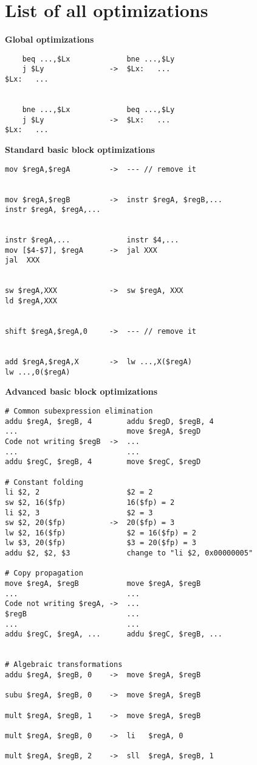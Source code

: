 \documentclass[10pt,a4paper]{article}
\begin{document}
\pagebreak
\appendix

\section{List of all optimizations}

\label{opt}

\textbf{Global optimizations}

\begin{verbatim}
    beq ...,$Lx             bne ...,$Ly
    j $Ly               ->  $Lx:   ...
$Lx:   ...


    bne ...,$Lx             beq ...,$Ly
    j $Ly               ->  $Lx:   ...
$Lx:   ...
\end{verbatim}
\textbf{Standard basic block optimizations}

\begin{verbatim}
mov $regA,$regA         ->  --- // remove it


mov $regA,$regB         ->  instr $regA, $regB,...
instr $regA, $regA,...


instr $regA,...             instr $4,...
mov [$4-$7], $regA      ->  jal XXX
jal  XXX


sw $regA,XXX            ->  sw $regA, XXX
ld $regA,XXX


shift $regA,$regA,0     ->  --- // remove it


add $regA,$regA,X       ->  lw ...,X($regA)
lw ...,0($regA)
\end{verbatim}
\textbf{Advanced basic block optimizations}

\begin{verbatim}
# Common subexpression elimination
addu $regA, $regB, 4        addu $regD, $regB, 4
...                         move $regA, $regD
Code not writing $regB  ->  ...
...                         ...
addu $regC, $regB, 4        move $regC, $regD

# Constant folding
li $2, 2                    $2 = 2
sw $2, 16($fp)              16($fp) = 2
li $2, 3                    $2 = 3
sw $2, 20($fp)          ->  20($fp) = 3
lw $2, 16($fp)              $2 = 16($fp) = 2
lw $3, 20($fp)              $3 = 20($fp) = 3
addu $2, $2, $3             change to "li $2, 0x00000005"

# Copy propagation
move $regA, $regB           move $regA, $regB
...                         ...
Code not writing $regA, ->  ...
$regB                       ...
...                         ...
addu $regC, $regA, ...      addu $regC, $regB, ...


# Algebraic transformations
addu $regA, $regB, 0    ->  move $regA, $regB

subu $regA, $regB, 0    ->  move $regA, $regB

mult $regA, $regB, 1    ->  move $regA, $regB

mult $regA, $regB, 0    ->  li   $regA, 0

mult $regA, $regB, 2    ->  sll  $regA, $regB, 1
\end{verbatim}
\end{document}
